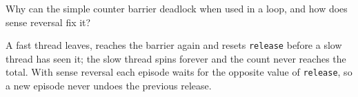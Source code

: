 \begin{exercise}
Why can the simple counter barrier deadlock when used in a loop, and how does sense
reversal fix it?
\end{exercise}
\begin{solution}
A fast thread leaves, reaches the barrier again and resets \texttt{release} before a
slow thread has seen it; the slow thread spins forever and the count never reaches
the total. With sense reversal each episode waits for the opposite value of
\texttt{release}, so a new episode never undoes the previous release.
\end{solution}

